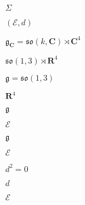 \begin{preview}
\setcounter{equation}{0}%
\( \Sigma \)
\end{preview}

\begin{preview}
\setcounter{equation}{0}%
\(( \mathcal{E}, d )\)
\end{preview}

\begin{preview}
\setcounter{equation}{0}%
\(  \mathfrak{g} _{\mathbf{C}} = \mathfrak{so}(k, \mathbf{C}) \rtimes \mathbf{C}^4 \)
\end{preview}

\begin{preview}
\setcounter{equation}{0}%
\( \mathfrak{so}(1,3) \rtimes \mathbf{R}^4 \)
\end{preview}

\begin{preview}
\setcounter{equation}{0}%
\(  \mathfrak{g}  = \mathfrak{so}(1,3) \)
\end{preview}

\begin{preview}
\setcounter{equation}{0}%
\( \mathbf{R}^4 \)
\end{preview}

\begin{preview}
\setcounter{equation}{0}%
\( \mathfrak{g} \)
\end{preview}

\begin{preview}
\setcounter{equation}{0}%
\( \mathcal{E} \)
\end{preview}

\begin{preview}
\setcounter{equation}{0}%
\( \mathfrak{g} \)
\end{preview}

\begin{preview}
\setcounter{equation}{0}%
\( \mathcal{E} \)
\end{preview}

\begin{preview}
\setcounter{equation}{0}%
\( d ^2=0\)
\end{preview}

\begin{preview}
\setcounter{equation}{0}%
\( d \)
\end{preview}

\begin{preview}
\setcounter{equation}{0}%
\( \mathcal{E} \)
\end{preview}

